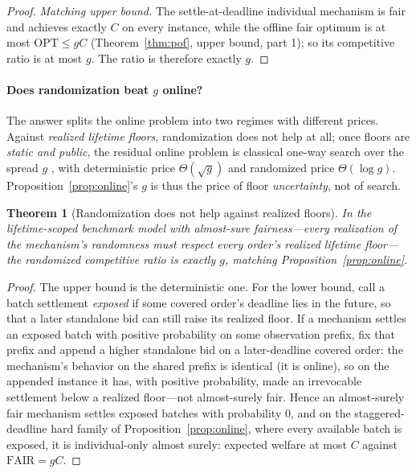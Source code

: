 \documentclass[11pt]{article}
\newtheorem{theorem}{Theorem}
\theoremstyle{remark}
\newcommand{\OPT}{\mathrm{OPT}}
\newcommand{\FAIR}{\mathrm{FAIR}}
\begin{document}
\begin{proof}
\emph{Matching upper bound.}
The settle-at-deadline individual mechanism is fair and achieves exactly
$C$ on every instance, while the offline fair optimum is at most
$\OPT\le gC$ (Theorem~\ref{thm:pof}, upper bound, part 1); so its
competitive ratio is at most $g$. The ratio is therefore exactly $g$.
\end{proof}

\paragraph{Does randomization beat $g$ online?}
The answer splits the online problem into two regimes with different
prices. Against \emph{realized lifetime floors}, randomization does not
help at all; once floors are \emph{static and public}, the residual
online problem is classical one-way search over the spread $g$
\cite{elyaniv2001}, with deterministic price $\Theta(\sqrt g)$ and
randomized price $\Theta(\log g)$. Proposition~\ref{prop:online}'s $g$
is thus the price of floor \emph{uncertainty}, not of search.

\begin{theorem}[Randomization does not help against realized floors]
\label{thm:onlinerand}
In the lifetime-scoped benchmark model with almost-sure fairness---every
realization of the mechanism's randomness must respect every order's
realized lifetime floor---the randomized competitive ratio is exactly
$g$, matching Proposition~\ref{prop:online}.
\end{theorem}

\begin{proof}
The upper bound is the deterministic one. For the lower bound, call a
batch settlement \emph{exposed} if some covered order's deadline lies in
the future, so that a later standalone bid can still raise its realized
floor. If a mechanism settles an exposed batch with positive probability
on some observation prefix, fix that prefix and append a higher
standalone bid on a later-deadline covered order: the mechanism's
behavior on the shared prefix is identical (it is online), so on the
appended instance it has, with positive probability, made an irrevocable
settlement below a realized floor---not almost-surely fair. Hence an
almost-surely fair mechanism settles exposed batches with probability
$0$, and on the staggered-deadline hard family of
Proposition~\ref{prop:online}, where every available batch is exposed,
it is individual-only almost surely: expected welfare at most $C$
against $\FAIR=gC$.
\end{proof}
\end{document}
